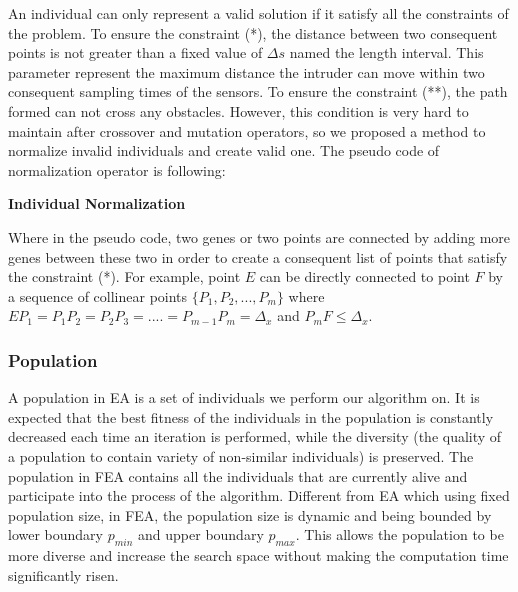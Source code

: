 \documentclass[final]{elsarticle}
\begin{document}
An individual can only represent a valid solution if it satisfy all the constraints of the problem. To ensure the constraint (*), the distance between two consequent points is not greater than a fixed value of $\Delta s$ named the length interval. This parameter represent the maximum distance the intruder can move within two consequent sampling times of the sensors. To ensure the constraint (**), the path formed can not cross any obstacles. However, this condition is very hard to maintain after crossover and mutation operators, so we proposed a method to normalize invalid individuals and create valid one. The pseudo code of normalization operator is following:

\begin{algorithm}[H]
	\SetAlgoLined
		\caption{\textbf{Individual Normalization}} 
		\label{alg.0}
\end{algorithm} 
Where in the pseudo code, two genes or two points are connected by adding more genes between these two in order to create a consequent list of points that satisfy the constraint (*). For example, point $ E $ can be directly connected to point $ F $ by a sequence of collinear points $\{P_1,P_2,...,P_m\}$ where $EP_1=P_1P_2=P_2P_3=....=P_{m-1}P_m=\Delta_x$ and $P_mF \leq \Delta_x$.\\

\subsubsection{Population}

A population in EA is a set of individuals we perform our algorithm on. It is expected that the best fitness of the individuals in the population is constantly decreased each time an iteration is performed, while the diversity (the quality of a population to contain variety of non-similar individuals) is preserved. The population in FEA contains all the individuals that are currently alive and participate into the process of the algorithm. Different from EA which using fixed population size, in FEA, the population size is dynamic and being bounded by lower boundary $p_{min}$ and upper boundary $p_{max}$. This allows the population to be more diverse and increase the search space without making the computation time significantly risen.
\end{document}
